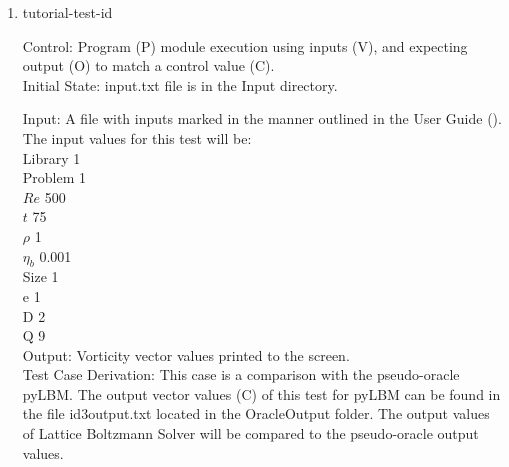 \documentclass[12pt, titlepage]{article}
\newcommand{\famname}{Lattice Boltzmann Solver}
\newcounter{testcounter} %
\begin{document}
\begin{enumerate}

\item{tutorial-test-id\thetestcounter \\}

Control: Program (P) module execution using inputs (V), and expecting output (O)
to match a control value (C).\\
					
Initial State: input.txt file is in the Input directory. %
					
Input: A file with inputs marked in the manner outlined in the
User Guide (\citet{LBM_UserGuide_PM}).\\The input values for this test will
be:\\
Library 1\\
Problem 1\\
$Re$ 500\\
$t$ 75\\
$\rho$ 1\\
$\eta_b$ 0.001\\
Size 1\\
$\mathrm{e}$ 1\\
$\mathrm{D}$ 2\\
$\mathrm{Q}$ 9\\


Output: Vorticity vector values printed to the screen. \\

Test Case Derivation: This case is a comparison with the pseudo-oracle
pyLBM. The output vector values (C) of this test for pyLBM can be found in the
file id3output.txt located in the OracleOutput folder. The output values of {\famname} will be compared to the pseudo-oracle output values. %


\end{enumerate}
\end{document}
